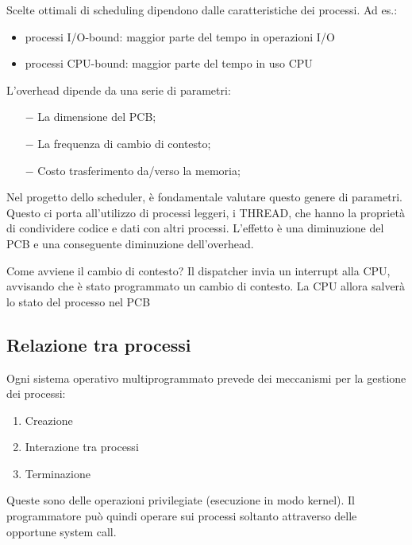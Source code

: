 \documentclass{article}
\begin{document}
Scelte ottimali di scheduling dipendono dalle caratteristiche dei processi. 
Ad es.:\begin{itemize}
    \item processi I/O-bound: maggior parte del tempo in operazioni I/O
    \item processi CPU-bound: maggior parte del tempo in uso CPU
\end{itemize}
\medskip

\noindent{}
\medskip

\noindent L'overhead dipende da una serie di parametri:\begin{itemize}
    \item[$-$] La dimensione del PCB;
    \item[$-$] La frequenza di cambio di contesto;
    \item[$-$] Costo trasferimento da/verso la memoria;
\end{itemize}
    
\noindent Nel progetto dello scheduler, è fondamentale valutare questo genere di 
parametri. Questo ci porta all'utilizzo di processi leggeri, i THREAD,
che hanno la proprietà di condividere codice e dati con altri processi.
L'effetto è una diminuzione del PCB e una conseguente diminuzione 
dell'overhead.
\medskip

\noindent Come avviene il cambio di contesto? Il dispatcher invia un interrupt alla CPU, avvisando che è stato programmato un cambio 
di contesto. La CPU allora salverà lo stato del processo nel PCB

\subsection{Relazione tra processi}
Ogni sistema operativo multiprogrammato prevede dei meccanismi per 
la gestione dei processi:
\begin{enumerate}
    \item Creazione
    \item Interazione tra processi
    \item Terminazione
\end{enumerate}
\noindent Queste sono delle operazioni privilegiate 
(esecuzione in modo kernel). Il programmatore può quindi operare sui
processi soltanto attraverso delle opportune system call.
\end{document}
